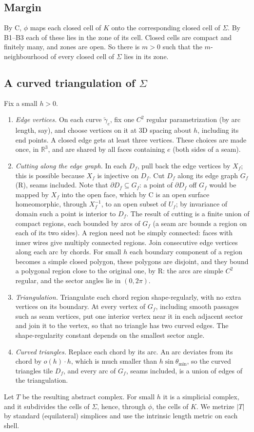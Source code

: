 \documentclass[preprint,12pt]{elsarticle}
\theoremstyle{definition}
\theoremstyle{remark}
\newcommand{\R}{\mathbb{R}}
\begin{document}
\subsection{Margin}
By C, $\phi$ maps each closed cell of $K$ onto the corresponding closed cell of $\Sigma$. By B1--B3 each of these lies in
the zone of its cell. Closed cells are compact and finitely many, and zones are open. So there is $m>0$ such that the
$m$-neighbourhood of every closed cell of $\Sigma$ lies in its zone.

\subsection{A curved triangulation of $\Sigma$}
Fix a small $h>0$.
\begin{enumerate}
\item \emph{Edge vertices.} On each curve $\tilde\gamma_e$, fix one $C^2$ regular parametrization (by arc length, say),
and choose vertices on it at 3D spacing about $h$, including its end points. A closed edge gets at least three
vertices. These choices are made once, in $\R^3$, and are shared by all faces containing $e$ (both sides of a seam).
\item \emph{Cutting along the edge graph.} In each $D_f$, pull back the edge vertices by $X_f$; this is possible because
$X_f$ is injective on $D_f$. Cut $D_f$ along its edge graph $G_f$ (R), seams included. Note that $\partial D_f\subseteq G_f$: a point of
$\partial D_f$ off $G_f$ would be mapped by $X_f$ into the open face, which by C is an open surface homeomorphic, through
$X_f^{-1}$, to an open subset of $U_f$; by invariance of domain such a point is interior to $D_f$. The result of cutting
is a finite union of compact regions, each bounded by arcs of $G_f$ (a seam arc bounds a region on each of its two
sides). A region need not be simply connected: faces with inner wires give multiply connected regions. Join consecutive
edge vertices along each arc by chords. For small $h$ each boundary component of a region becomes a simple closed
polygon, these polygons are disjoint, and they bound a polygonal region close to the original one, by R: the arcs are
simple $C^2$ regular, and the sector angles lie in $(0,2\pi)$.
\item \emph{Triangulation.} Triangulate each chord region shape-regularly, with no extra vertices on its boundary. At
every vertex of $G_f$, including smooth passages such as seam vertices, put one interior vertex near it in each adjacent
sector and join it to the vertex, so that no triangle has two curved edges. The shape-regularity constant depends on
the smallest sector angle.
\item \emph{Curved triangles.} Replace each chord by its arc. An arc deviates from its chord by $o(h)\cdot h$, which is
much smaller than $h\sin\theta_{\min}$, so the curved triangles tile $D_f$, and every arc of $G_f$, seams included, is a
union of edges of the triangulation.
\end{enumerate}
Let $T$ be the resulting abstract complex. For small $h$ it is a simplicial complex, and it subdivides the cells of
$\Sigma$, hence, through $\phi$, the cells of $K$. We metrize $|T|$ by standard (equilateral) simplices and use the intrinsic
length metric on each shell.
\end{document}

